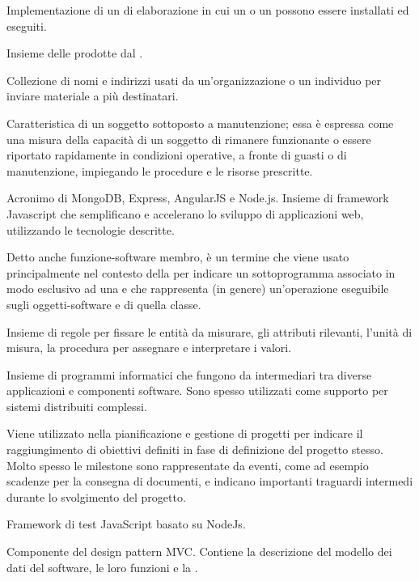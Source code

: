 {Implementazione  di un  di elaborazione in cui un  o un  possono essere installati ed eseguiti.}

{Insieme delle  prodotte dal  .}

{Collezione di nomi e indirizzi usati da un'organizzazione o un individuo per inviare materiale a più destinatari.}

{Caratteristica di un soggetto sottoposto a manutenzione; essa è espressa come una misura della capacità di un soggetto di rimanere funzionante o essere riportato rapidamente in condizioni operative, a fronte di guasti o di manutenzione, impiegando le procedure e le risorse prescritte. }

{Acronimo di MongoDB, Express, AngularJS e Node.js. Insieme di framework Javascript che semplificano e accelerano lo sviluppo di applicazioni web, utilizzando le tecnologie descritte.}

{Detto anche funzione-software membro, è un termine che viene usato principalmente nel contesto della   per indicare un sottoprogramma associato in modo esclusivo ad una  e che rappresenta (in genere) un'operazione eseguibile sugli oggetti-software e  di quella classe.}

{Insieme di regole per fissare le entità da misurare, gli attributi rilevanti, l'unità di misura, la procedura per assegnare e interpretare i valori.}

{Insieme di programmi informatici che fungono da intermediari tra diverse applicazioni e componenti software. Sono spesso utilizzati come supporto per sistemi distribuiti complessi.}

{Viene utilizzato nella pianificazione e gestione di progetti per indicare il raggiungimento di obiettivi definiti in fase di definizione del progetto stesso. Molto spesso le milestone sono rappresentate da eventi, come ad esempio scadenze per la consegna di documenti, e indicano importanti traguardi intermedi durante lo svolgimento del progetto.}

{Framework di test JavaScript basato su NodeJs.}

{Componente del design pattern MVC. Contiene la descrizione del modello dei dati del software, le loro funzioni e la .}

